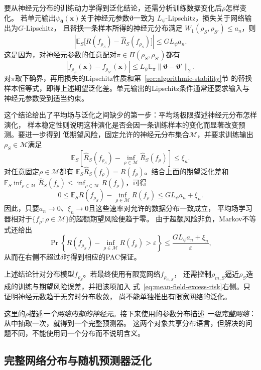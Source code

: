 要从神经元分布的训练动力学得到泛化结论，还需分析训练数据变化后$\rho$怎样变化。
若单元输出$\psi_{\bm\vartheta}(\bm x)$关于神经元参数$\bm\vartheta$一致为
$L_\psi$-Lipschitz，损失关于网络输出为$G$-Lipschitz，
且替换一条样本所得的神经元分布满足
$W_1(\rho_S,\rho_{S'})\leq a_n$，则
\[
 \left|\mathbb E_S\bigl[R(f_{\rho_S})-\hat R_S(f_{\rho_S})\bigr]\right|
 \leq G L_\psi a_n.
\]
这是因为，对神经元参数的任意配对$\pi\in\Pi(\rho_S,\rho_{S'})$都有
\[
 |f_{\rho_S}(\bm x)-f_{\rho_{S'}}(\bm x)|
 \leq L_\psi\mathbb E_\pi
       \|\bm\vartheta-\bm\vartheta'\|_2.
\]
对$\pi$取下确界，再用损失的Lipschitz性质和第~\ref{sec:algorithmic-stability}节
的替换样本恒等式，即得上述期望泛化差。单元输出的Lipschitz条件通常还要求输入与
神经元参数受到适当约束。

这个结论给出了平均场与泛化之间缺少的第一步：平均场极限描述神经元分布怎样演化，
样本稳定性则说明这种演化是否会因一条训练样本的变化而显著改变预测。要进一步得到
低期望风险，固定允许的神经元分布集合$\mathcal M$，并要求训练输出
$\rho_S\in\mathcal M$满足
\[
 \mathbb E_S\left[
   \hat R_S(f_{\rho_S})
   -\inf_{\rho\in\mathcal M}\hat R_S(f_\rho)
 \right]\leq\xi_n.
\]
对任意固定$\rho\in\mathcal M$都有
$\mathbb E_S\hat R_S(f_\rho)=R(f_\rho)$。结合上面的期望泛化差和
$\mathbb E_S\inf_{\rho\in\mathcal M}\hat R_S(f_\rho)
\leq\inf_{\rho\in\mathcal M}R(f_\rho)$，可得
\begin{equation}
 0\leq
 \mathbb E_S R(f_{\rho_S})
 -\inf_{\rho\in\mathcal M}R(f_\rho)
 \leq G L_\psi a_n+\xi_n.
 \label{eq:mean-field-excess-risk}
\end{equation}
因此，只要$a_n\to0$、$\xi_n\to0$且这些速率对允许的数据分布一致成立，
平均场学习器相对于$\{f_\rho:\rho\in\mathcal M\}$的超额期望风险便趋于零。
由于超额风险非负，Markov不等式还给出
\[
 \Pr\left\{
 R(f_{\rho_S})-\inf_{\rho\in\mathcal M}R(f_\rho)>\varepsilon
 \right\}
 \leq\frac{G L_\psi a_n+\xi_n}{\varepsilon},
\]
从而在右侧不超过$\delta$时得到相应的PAC保证。

上述结论针对分布模型$f_{\rho_S}$。若最终使用有限宽网络$f_{\rho_{m,S}}$，
还需控制$\rho_{m,S}$逼近$\rho_S$造成的训练与期望风险误差，并把该项加入
式~\eqref{eq:mean-field-excess-risk}右侧。只证明神经元数趋于无穷时分布收敛，
尚不能单独推出有限宽网络的泛化。

这里的$\rho$描述\emph{一个网络内部的神经元}。接下来使用的参数分布描述
\emph{一组完整网络}：从中抽取一次，就得到一个完整预测器。
这两个对象共享分布语言，但解决的问题不同，不能使用同一个分布而不说明含义。

\subsection{完整网络分布与随机预测器泛化}
\label{sec:pac-bayes}

